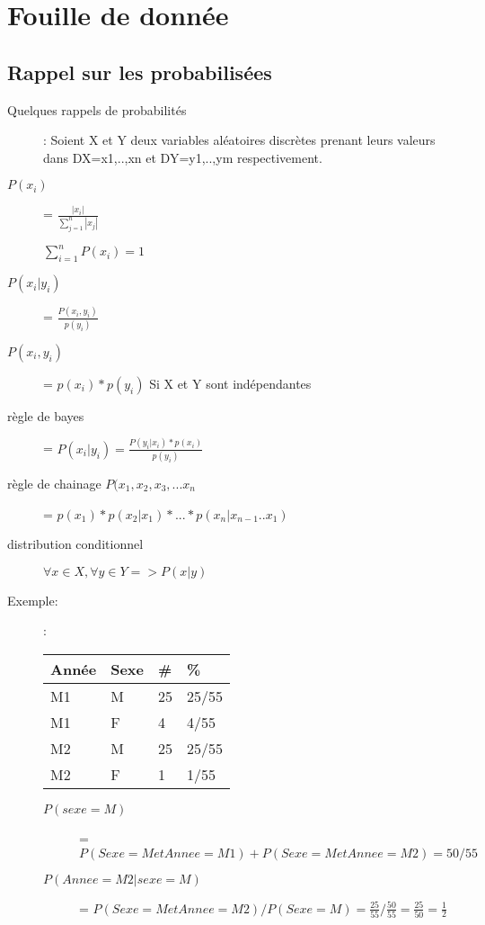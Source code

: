\part{Fouille de donnée}
\pagebreak

\chapter{Rappel sur les probabilisées}

\begin{description}
\item[Quelques rappels de probabilités]: Soient X et Y deux variables aléatoires discrètes prenant leurs valeurs dans DX={x1,..,xn} et DY={y1,..,ym} respectivement.  
\item[$P(x_i)$] = $\frac{|x_i|}{\sum_{j=1}^n |x_j|}$
\item[] $\sum_{i=1}^n P(x_i) = 1$
\item[$P(x_i | y_i)$] = $\frac{P(x_i,y_i)}{p(y_i)}$
\item[$P(x_i,y_i)$] = $p(x_i) * p(y_i)$ Si X et Y sont indépendantes
\item[règle de bayes] = $P(x_i|y_i) = \frac{P(y_i|x_i)*p(x_i)}{p(y_i)}$
\item[règle de chainage $P(x_1,x_2,x_3,...x_n$] = $p(x_1)*p(x_2|x_1)*...*p(x_n|x_{n-1}..x_1)$
\item[distribution conditionnel] $ \forall x \in X, \forall y \in Y => P(x|y)$
\end{description}

Exemple:
\begin{description}
\item[]: 
\begin{tabular}{ll|ll}
  \hline
  Année & Sexe & \# & \%  \\
  \hline
   M1 & M  & 25  &  25/55   \\
   M1 & F  & 4 &  4/55  \\
   M2 & M  & 25  & 25/55   \\
   M2 & F  & 1  &  1/55  \\
  \hline
\end{tabular}
\item[]
\begin{description}
\item[$P(sexe=M)$] = $P(Sexe=M et Annee=M1) + P(Sexe=M et Annee=M2) = 50/55$
\item[$P(Annee=M2 | sexe=M)$] = $P(Sexe=M et Annee=M2) / P(Sexe=M) = \frac{25}{55} / \frac{50}{55} = \frac{25}{50} = \frac{1}{2}$
\end{description}
\end{description}

